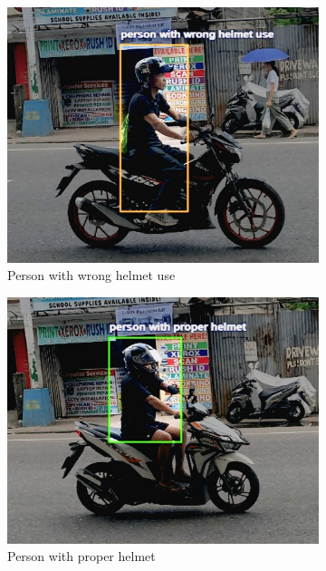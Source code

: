 \begin{refsection}
\begin{figure}[H]
    \begin{subfigure}{0.30\textwidth}
        \centering
        \includegraphics[width=0.9\linewidth]{figures/Fig 4c.jpg}
        \caption{Person with wrong helmet use}
        \label{fig:4c}
    \end{subfigure}%
    \hfill
    \begin{subfigure}{0.30\textwidth}
        \centering
        \includegraphics[width=0.9\linewidth]{figures/Fig 4d.jpg}
        \caption{Person with proper helmet}
        \label{fig:4d}
    \end{subfigure}
        \hfill
    \begin{subfigure}{0.30\textwidth}
        \centering

\end{subfigure}
\end{figure}
\end{refsection}
